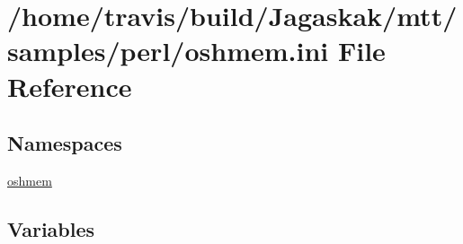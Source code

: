 \hypertarget{oshmem_8ini}{\section{/home/travis/build/\-Jagaskak/mtt/samples/perl/oshmem.ini File Reference}
\label{oshmem_8ini}
}
\subsection*{Namespaces}
\begin{DoxyCompactItemize}
\item 
\hyperlink{namespaceoshmem}{oshmem}
\end{DoxyCompactItemize}
\subsection*{Variables}
